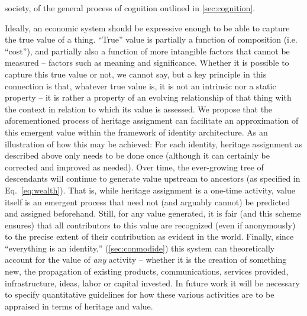 \documentclass[pra,twocolumn,groupedaddress,10pt]{revtex4}
\theoremstyle{definition}
\begin{document}
society, of the general process of cognition outlined in \autoref{sec:cognition}.

Ideally, an economic system should be expressive enough to be able to capture the true value of a thing. ``True'' value is partially a function of composition (i.e. ``cost''), and partially also a function of more intangible factors that cannot be measured -- factors such as meaning and significance. Whether it is possible to capture this true value or not, we cannot say, but a key principle in this connection is that, whatever true value is, it is not an intrinsic nor a static property -- it is rather a property of an evolving relationship of that thing with the context in relation to which its value is assessed. We propose that the aforementioned process of heritage assignment can facilitate an approximation of this emergent value within the framework of identity architecture. As an illustration of how this may be achieved: For each identity, heritage assignment as described above only needs to be done once (although it can certainly be corrected and improved as needed). Over time, the ever-growing tree of descendants will continue to generate value upstream to ancestors (as specified in Eq.~\ref{eq:wealth}). That is, while heritage assignment is a one-time activity, value itself is an emergent process that need not (and arguably cannot) be predicted and assigned beforehand. Still, for any value generated, it is fair (and this scheme ensures) that all contributors to this value are recognized (even if anonymously) to the precise extent of their contribution as evident in the world. Finally, since ``everything is an identity,'' (\autoref{sec:conmodide}) this system can theoretically account for the value of \textit{any} activity -- whether it is the creation of something new, the propagation of existing products, communications, services provided, infrastructure, ideas, labor or capital invested. In future work it will be necessary to specify quantitative guidelines for how these various activities are to be appraised in terms of heritage and value.
\end{document}
